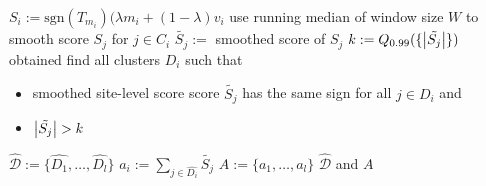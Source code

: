 \documentclass{report}
\begin{document}
\begin{algorithm}
\begin{algorithmic}[1]
                \State $S_i := \mathrm{sgn}(T_{m_i})( \lambda m_i + (1-\lambda)v_i$      
            \EndFor
                \State use running median of window size $W$ to smooth score $S_{j}$ for $j \in C_i$
                \State $\tilde{S_j} :=$ smoothed score of $S_j$
            \EndFor
        \State $k := Q_{0.99}( \{ \abs{\tilde{S_j}}\})$  obtained
        \State find all clusters $D_i$ such that \cprotect{}
            \begin{itemize}
                \item smoothed site-level score score $\tilde{S_j}$ has the same sign for all $j \in D_i$ and
                \item $\abs{\tilde{S_j}} >k$
            \end{itemize}
        \State $\hat{\mathcal{D}} := \{\hat{D_1},\ldots, \hat{D_l}\}$ 
        \State $a_i := \sum_{j \in \hat{D_i}} \tilde{S_j}$ 
        \EndFor
        \State $A := \{a_1,\ldots,a_l\}$
        \State \Return $\hat{\mathcal{D}}$ and $A$
       \end{algorithmic}
   \end{algorithm}
\end{document}
